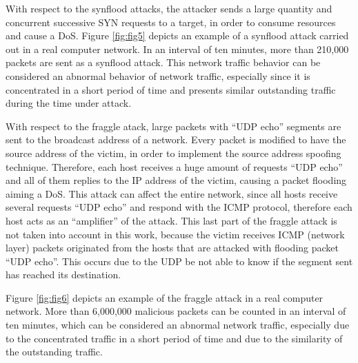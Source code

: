 \documentclass{bmcart}
\begin{document}
With respect to the synflood attacks, the attacker sends a large quantity and concurrent successive SYN requests to a target, in order to consume resources and cause a DoS. Figure \ref{fig:fig5} depicts an example of a synflood attack carried out in a real computer network. In an interval of ten minutes, more than 210,000 packets are sent as a synflood attack. This network traffic behavior can be considered an abnormal behavior of network traffic, especially since it is concentrated in a short period of time and presents similar outstanding traffic during the time under attack.


With respect to the fraggle atack, large packets with ``UDP echo'' segments are sent to the broadcast address of a network. Every packet is modified to have the source address of the victim, in order to implement the source address spoofing technique. Therefore, each host receives a huge amount of requests ``UDP echo'' and all of them replies to the IP address of the victim, causing a packet flooding aiming a DoS. This attack can affect the entire network, since all hosts receive several requests ``UDP echo'' and respond with the ICMP protocol, therefore each host acts as an ``amplifier'' of the attack. This last part of the fraggle attack is not taken into account in this work, because the victim receives ICMP (network layer) packets originated from the hosts that are attacked with flooding packet ``UDP echo''. This occurs due to the UDP be not able to know if the segment sent has reached its destination.

Figure \ref{fig:fig6} depicts an example of the fraggle attack in a real computer network. More than 6,000,000 malicious packets can be counted in an interval of ten minutes, which can be considered an abnormal network traffic, especially due to the concentrated traffic in a short period of time and due to the similarity of the outstanding traffic.

\end{document}
